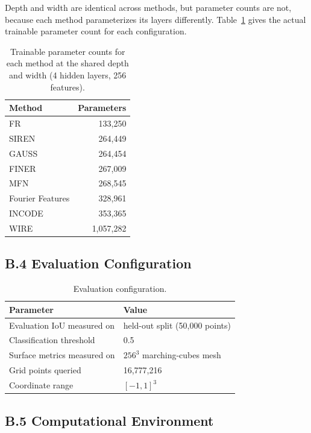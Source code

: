 Depth and width are identical across methods, but parameter counts are not, because each
method parameterizes its layers differently. Table~\ref{tab:param_counts} gives the actual
trainable parameter count for each configuration.

\begin{table}[htbp]
\centering
\caption{Trainable parameter counts for each method at the shared depth and width (4 hidden layers, 256 features).}
\label{tab:param_counts}
\begin{tabular}{lr}
\toprule
\textbf{Method} & \textbf{Parameters} \\
\midrule
FR & 133,250 \\
SIREN & 264,449 \\
GAUSS & 264,454 \\
FINER & 267,009 \\
MFN & 268,545 \\
Fourier Features & 328,961 \\
INCODE & 353,365 \\
WIRE & 1,057,282 \\
\bottomrule
\end{tabular}
\end{table}

\subsection*{B.4 Evaluation Configuration}

\begin{table}[htbp]
\centering
\caption{Evaluation configuration.}
\label{tab:eval_config}
\begin{tabular}{ll}
\toprule
\textbf{Parameter} & \textbf{Value} \\
\midrule
Evaluation IoU measured on & held-out split (50,000 points) \\
Classification threshold & 0.5 \\
Surface metrics measured on & $256^3$ marching-cubes mesh \\
Grid points queried & 16,777,216 \\
Coordinate range & $[-1, 1]^3$ \\
\bottomrule
\end{tabular}
\end{table}

\subsection*{B.5 Computational Environment}

